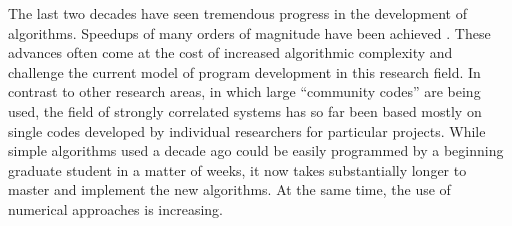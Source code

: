 \documentclass[12pt]{iopart}
\begin{document}
The last two decades have seen tremendous progress in the development of
algorithms.  Speedups of many orders of magnitude have been 
achieved \cite{Evertz03,Troyer03,White1992,Schollwock2005,vidal1,vidal2,Daley2004,White2004,Rubtsov04,Rubtsov05,Werner06,Werner06Kondo, Gull08_ctaux}. These
advances often come at the cost of increased algorithmic
complexity and challenge the current model of program development in
this research field. In contrast to other research areas, in which
large ``community codes'' are being used, the field of strongly
correlated systems has so far been based mostly on single codes developed by
individual researchers for particular projects. While simple
algorithms used a decade ago could be easily programmed by a beginning
graduate student in a matter of weeks, it now takes substantially
longer to master and implement the new algorithms.  At the same time, the use of numerical approaches is increasing.  
\end{document}
